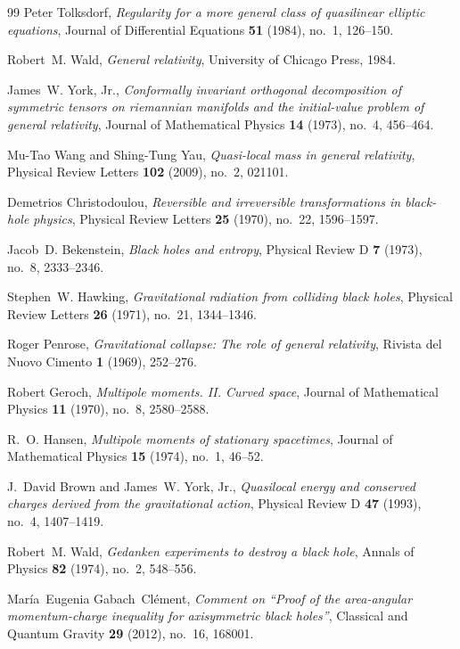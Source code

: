 \documentclass[12pt]{article}
\theoremstyle{plain}
\theoremstyle{definition}
\theoremstyle{remark}
\begin{document}
\begin{thebibliography}{99}
Peter Tolksdorf, \emph{Regularity for a more general class of quasilinear
  elliptic equations}, Journal of Differential Equations \textbf{51} (1984),
  no.~1, 126--150.

Robert~M. Wald, \emph{General relativity}, University of Chicago Press, 1984.

James~W. York, Jr., \emph{Conformally invariant orthogonal decomposition of
  symmetric tensors on riemannian manifolds and the initial-value problem of
  general relativity}, Journal of Mathematical Physics \textbf{14} (1973),
  no.~4, 456--464.

Mu-Tao Wang and Shing-Tung Yau, \emph{Quasi-local mass in general relativity}, Physical Review Letters \textbf{102} (2009), no.~2, 021101.

Demetrios Christodoulou, \emph{Reversible and irreversible transformations in black-hole physics}, Physical Review Letters \textbf{25} (1970), no.~22, 1596--1597.

Jacob~D. Bekenstein, \emph{Black holes and entropy}, Physical Review D \textbf{7} (1973), no.~8, 2333--2346.

Stephen~W. Hawking, \emph{Gravitational radiation from colliding black holes}, Physical Review Letters \textbf{26} (1971), no.~21, 1344--1346.

Roger Penrose, \emph{Gravitational collapse: The role of general relativity}, Rivista del Nuovo Cimento \textbf{1} (1969), 252--276.

Robert Geroch, \emph{Multipole moments. II. Curved space}, Journal of Mathematical Physics \textbf{11} (1970), no.~8, 2580--2588.

R.~O. Hansen, \emph{Multipole moments of stationary spacetimes}, Journal of Mathematical Physics \textbf{15} (1974), no.~1, 46--52.

J.~David Brown and James~W. York, Jr., \emph{Quasilocal energy and conserved charges derived from the gravitational action}, Physical Review D \textbf{47} (1993), no.~4, 1407--1419.

Robert~M. Wald, \emph{Gedanken experiments to destroy a black hole}, Annals of Physics \textbf{82} (1974), no.~2, 548--556.

Mar\'ia~Eugenia Gabach~Cl\'ement, \emph{Comment on ``Proof of the area-angular momentum-charge inequality for axisymmetric black holes''}, Classical and Quantum Gravity \textbf{29} (2012), no.~16, 168001.


\end{thebibliography}
\end{document}
